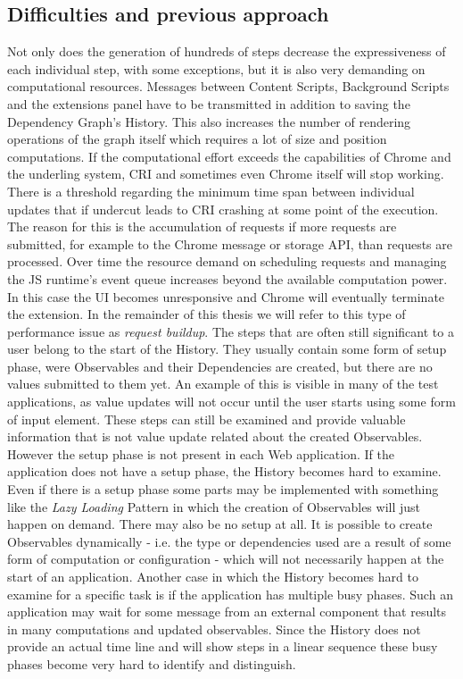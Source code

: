 \subsection{Difficulties and previous approach}
Not only does the generation of hundreds of steps decrease the expressiveness of each individual step, with some exceptions, but it is also very demanding on computational resources. Messages between Content Scripts, Background Scripts and the extensions panel have to be transmitted in addition to saving the Dependency Graph's History. This also increases the number of rendering operations of the graph itself which requires a lot of size and position computations. If the computational effort exceeds the capabilities of Chrome and the underling system, CRI and sometimes even Chrome itself will stop working. There is a threshold regarding the minimum time span between individual updates that if undercut leads to CRI crashing at some point of the execution. The reason for this is the accumulation of requests if more requests are submitted, for example to the Chrome message or storage API, than requests are processed. Over time the resource demand on scheduling requests and managing the JS runtime's event queue increases beyond the available computation power. In this case the UI becomes unresponsive and Chrome will eventually terminate the extension. In the remainder of this thesis we will refer to this type of performance issue as \emph{request buildup}.
The steps that are often still significant to a user belong to the start of the History. They usually contain some form of setup phase, were Observables and their Dependencies are created, but there are no values submitted to them yet. An example of this is visible in many of the test applications, as value updates will not occur until the user starts using some form of input element. These steps can still be examined and provide valuable information that is not value update related about the created Observables. However the setup phase is not present in each Web application. If the application does not have a setup phase, the History becomes hard to examine. Even if there is a setup phase some parts may be implemented with something like the \emph{Lazy Loading} Pattern \cite{Lazy} in which the creation of Observables will just happen on demand. There may also be no setup at all. It is possible to create Observables dynamically - i.e. the type or dependencies used are a result of some form of computation or configuration - which will not necessarily happen at the start of an application. Another case in which the History becomes hard to examine for a specific task is if the application has multiple busy phases. Such an application may wait for some message from an external component that results in many computations and updated observables. Since the History does not provide an actual time line and will show steps in a linear sequence these busy phases become very hard to identify and distinguish. 
